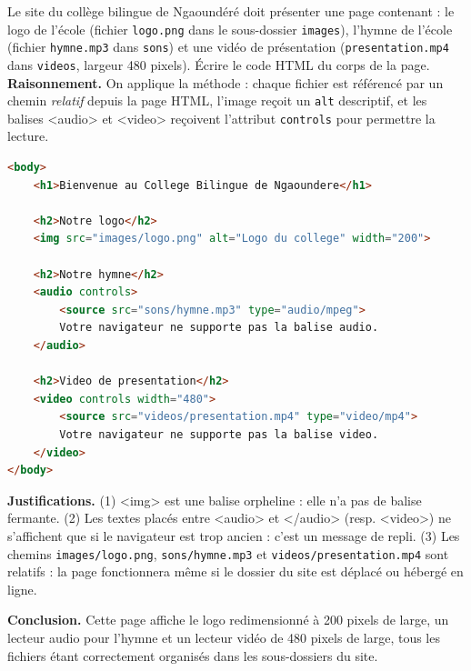 \documentclass[11pt]{article}
\newcommand{\cle}[1]{{\popxbold\color{popdark}#1}}
\newcounter{popsec}
\newcounter{popsub}
\newcommand{\courssub}[1]{%
  \stepcounter{popsub}%
  \par\vspace{9pt}\noindent{\popxbold\fontsize{11.5}{13}\selectfont\color{popink}{\color{poporange}\thepopsec.\thepopsub}\hspace{6pt}#1}\par\nopagebreak\vspace{4pt}
}
\begin{document}
\begin{exoresolu}
Le site du collège bilingue de Ngaoundéré doit présenter une page contenant : le logo de l'école (fichier \texttt{logo.png} dans le sous-dossier \texttt{images}), l'hymne de l'école (fichier \texttt{hymne.mp3} dans \texttt{sons}) et une vidéo de présentation (\texttt{presentation.mp4} dans \texttt{videos}, largeur 480 pixels). Écrire le code HTML du corps de la page.
\tcblower
\textbf{Raisonnement.} On applique la méthode : chaque fichier est référencé par un chemin \emph{relatif} depuis la page HTML, l'image reçoit un \texttt{alt} descriptif, et les balises \cle{<audio>} et \cle{<video>} reçoivent l'attribut \texttt{controls} pour permettre la lecture.
\begin{lstlisting}[language=HTML]
<body>
    <h1>Bienvenue au College Bilingue de Ngaoundere</h1>

    <h2>Notre logo</h2>
    <img src="images/logo.png" alt="Logo du college" width="200">

    <h2>Notre hymne</h2>
    <audio controls>
        <source src="sons/hymne.mp3" type="audio/mpeg">
        Votre navigateur ne supporte pas la balise audio.
    </audio>

    <h2>Video de presentation</h2>
    <video controls width="480">
        <source src="videos/presentation.mp4" type="video/mp4">
        Votre navigateur ne supporte pas la balise video.
    </video>
</body>
\end{lstlisting}
\textbf{Justifications.} (1) \cle{<img>} est une balise orpheline : elle n'a pas de balise fermante. (2) Les textes placés entre \cle{<audio>} et \cle{</audio>} (resp. \cle{<video>}) ne s'affichent que si le navigateur est trop ancien : c'est un message de repli. (3) Les chemins \texttt{images/logo.png}, \texttt{sons/hymne.mp3} et \texttt{videos/presentation.mp4} sont relatifs : la page fonctionnera même si le dossier du site est déplacé ou hébergé en ligne.

\textbf{Conclusion.} Cette page affiche le logo redimensionné à 200 pixels de large, un lecteur audio pour l'hymne et un lecteur vidéo de 480 pixels de large, tous les fichiers étant correctement organisés dans les sous-dossiers du site.
\end{exoresolu}

\courssub{Les formulaires en HTML}
\end{document}
